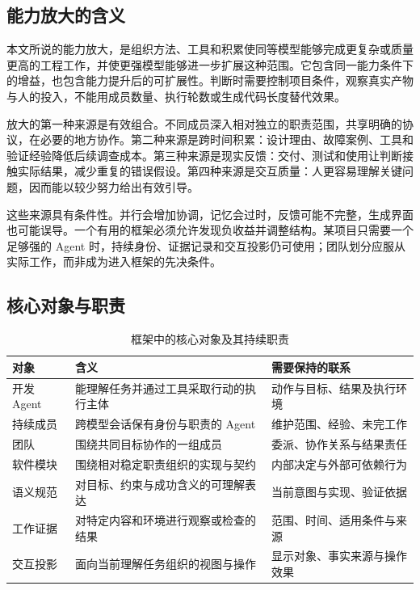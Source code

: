 \label{sec:framework}
\subsection{能力放大的含义}
本文所说的能力放大，是组织方法、工具和积累使同等模型能够完成更复杂或质量更高的工程工作，并使更强模型能够进一步扩展这种范围。它包含同一能力条件下的增益，也包含能力提升后的可扩展性。判断时需要控制项目条件，观察真实产物与人的投入，不能用成员数量、执行轮数或生成代码长度替代效果。

放大的第一种来源是有效组合。不同成员深入相对独立的职责范围，共享明确的协议，在必要的地方协作。第二种来源是跨时间积累：设计理由、故障案例、工具和验证经验降低后续调查成本。第三种来源是现实反馈：交付、测试和使用让判断接触实际结果，减少重复的错误假设。第四种来源是交互质量：人更容易理解关键问题，因而能以较少努力给出有效引导。

这些来源具有条件性。并行会增加协调，记忆会过时，反馈可能不完整，生成界面也可能误导。一个有用的框架必须允许发现负收益并调整结构。某项目只需要一个足够强的 Agent 时，持续身份、证据记录和交互投影仍可使用；团队划分应服从实际工作，而非成为进入框架的先决条件。

\subsection{核心对象与职责}
\begin{table}[htbp]\centering\small
\caption{框架中的核心对象及其持续职责}\label{tab:objects}
\begin{tabularx}{\linewidth}{p{2.4cm}YY}\toprule
对象 & 含义 & 需要保持的联系\\\midrule
开发 Agent & 能理解任务并通过工具采取行动的执行主体 & 动作与目标、结果及执行环境\\
持续成员 & 跨模型会话保有身份与职责的 Agent & 维护范围、经验、未完工作\\
团队 & 围绕共同目标协作的一组成员 & 委派、协作关系与结果责任\\
软件模块 & 围绕相对稳定职责组织的实现与契约 & 内部决定与外部可依赖行为\\
语义规范 & 对目标、约束与成功含义的可理解表达 & 当前意图与实现、验证依据\\
工作证据 & 对特定内容和环境进行观察或检查的结果 & 范围、时间、适用条件与来源\\
交互投影 & 面向当前理解任务组织的视图与操作 & 显示对象、事实来源与操作效果\\\bottomrule
\end{tabularx}\end{table}

